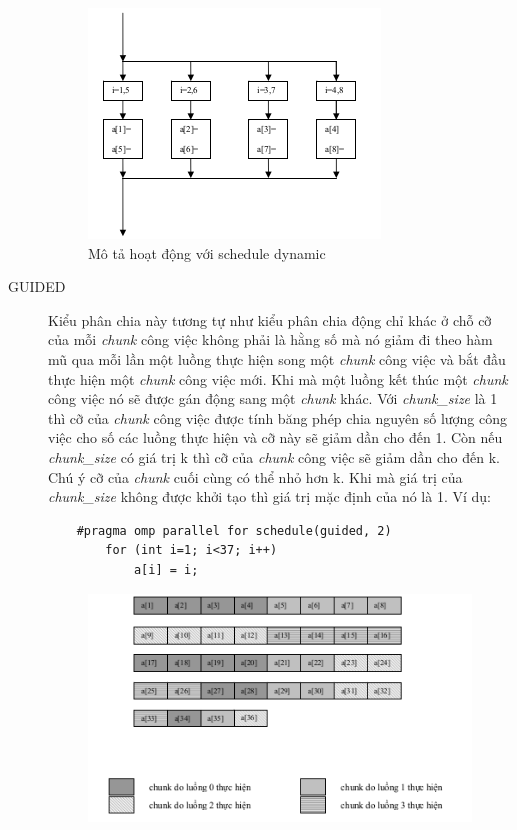 \documentclass{report}
\begin{document}
\begin{description}
\begin{figure}[htp]
				\centering
				\includegraphics[scale=1.0]{img/pic6.png}
				\caption{Mô tả hoạt động với schedule dynamic}
			\end{figure}
	\item[GUIDED]
	Kiểu phân chia này tương tự như kiểu phân chia động chỉ khác ở chỗ cỡ của mỗi \emph{chunk} công việc không phải là hằng số mà nó giảm đi theo hàm mũ qua mỗi lần một luồng thực hiện song một \emph{chunk} công việc và bắt đầu thực hiện một \emph{chunk} công việc mới. Khi mà một luồng kết thúc một \emph{chunk} công việc nó sẽ được gán động sang một \emph{chunk} khác. Với \emph{chunk\_size} là 1 thì cỡ của \emph{chunk} công việc được tính băng phép chia nguyên số lượng công việc cho số các luồng thực hiện và cỡ này sẽ giảm dần cho đến 1. Còn nếu \emph{chunk\_size} có giá trị k thì cỡ của \emph{chunk} công việc sẽ giảm dần cho đến k. Chú ý cỡ của \emph{chunk} cuối cùng có thể nhỏ hơn k. Khi mà giá trị của \emph{chunk\_size} không được khởi tạo thì giá trị mặc định của nó là 1.
	Ví dụ:
	\begin{verbatim}
	#pragma omp parallel for schedule(guided, 2)
		for (int i=1; i<37; i++)
			a[i] = i;
	\end{verbatim}
	\begin{figure}[htp]
		\centering
		\includegraphics[scale=1.0]{img/pic7.png}

\end{figure}
\end{description}
\end{document}
